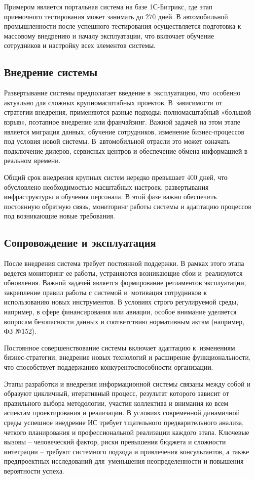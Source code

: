 \documentclass{ou}
\begin{document}
Примером является портальная система на базе 1С-Битрикс, где этап приемочного тестирования может занимать до 270 дней. В автомобильной промышленности после успешного тестирования осуществляется подготовка к массовому внедрению и началу эксплуатации, что включает обучение сотрудников и настройку всех элементов системы.
\subsection{Внедрение системы}
Развертывание системы предполагает введение в~эксплуатацию, что~особенно актуально для сложных крупномасштабных проектов. В~зависимости от стратегии внедрения, применяются разные подходы: полномасштабный «большой взрыв», поэтапное внедрение или франчайзинг. Важной задачей на этом этапе является миграция данных, обучение сотрудников, изменение бизнес-процессов под условия новой системы. В~автомобильной отрасли это может означать подключение дилеров, сервисных центров и обеспечение обмена информацией в реальном времени.

Общий срок внедрения крупных систем нередко превышает 400 дней, что обусловлено необходимостью масштабных настроек, развертывания инфраструктуры и обучения персонала. В этой фазе важно обеспечить постоянную обратную связь, мониторинг работы системы и адаптацию процессов под возникающие новые требования.
\subsection{Сопровождение и эксплуатация}
После внедрения система требует постоянной поддержки. В рамках этого этапа ведется мониторинг ее работы, устраняются возникающие сбои и~реализуются обновления. Важной задачей является формирование регламентов эксплуатации, закрепление правил работы с системой и~мотивация сотрудников к использованию новых инструментов. В условиях строго регулируемой среды, например, в сфере финансирования или авиации, особое внимание уделяется вопросам безопасности данных и соответствию нормативным актам (например, ФЗ №152).

Постоянное совершенствование системы включает адаптацию к~изменениям бизнес-стратегии, внедрение новых технологий и расширение функциональности, что способствует поддержанию конкурентоспособности организации.

Этапы разработки и внедрения информационной системы связаны между собой и образуют цикличный, итеративный процесс, результат которого зависит от правильного выбора методологии, участия коллектива и внимания ко всем аспектам проектирования и реализации. В условиях современной динамичной среды успешное внедрение ИС требует тщательного предварительного анализа, четкого планирования и профессиональной реализации каждого этапа. Ключевые вызовы -- человеческий фактор, риски превышения бюджета и сложности интеграции -- требуют системного подхода и привлечения консультантов, а также предпроектных исследований для~уменьшения неопределенности и повышения вероятности успеха.
\newpage
\end{document}
